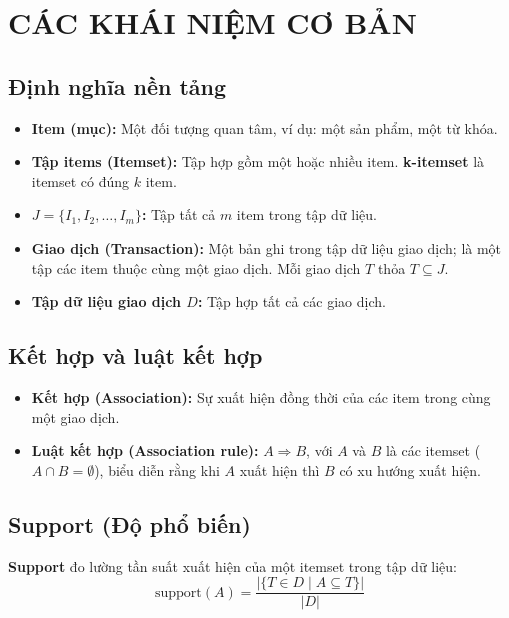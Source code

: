 \documentclass[10pt]{article}
\begin{document}
\section{CÁC KHÁI NIỆM CƠ BẢN}

\subsection{Định nghĩa nền tảng}

\begin{itemize}
    \item \textbf{Item (mục):} Một đối tượng quan tâm, ví dụ: một sản phẩm, một từ khóa.
    \item \textbf{Tập items (Itemset):} Tập hợp gồm một hoặc nhiều item. \textbf{k-itemset} là itemset có đúng $k$ item.
    \item \textbf{$J = \{I_1, I_2, \ldots, I_m\}$:} Tập tất cả $m$ item trong tập dữ liệu.
    \item \textbf{Giao dịch (Transaction):} Một bản ghi trong tập dữ liệu giao dịch; là một tập các item thuộc cùng một giao dịch. Mỗi giao dịch $T$ thỏa $T \subseteq J$.
    \item \textbf{Tập dữ liệu giao dịch $D$:} Tập hợp tất cả các giao dịch.
\end{itemize}

\subsection{Kết hợp và luật kết hợp}

\begin{itemize}
    \item \textbf{Kết hợp (Association):} Sự xuất hiện đồng thời của các item trong cùng một giao dịch.
    \item \textbf{Luật kết hợp (Association rule):} $A \Rightarrow B$, với $A$ và $B$ là các itemset ($A \cap B = \emptyset$), biểu diễn rằng khi $A$ xuất hiện thì $B$ có xu hướng xuất hiện.
\end{itemize}

\subsection{Support (Độ phổ biến)}

\textbf{Support} đo lường tần suất xuất hiện của một itemset trong tập dữ liệu:
\[
\text{support}(A) = \frac{|\{T \in D \mid A \subseteq T\}|}{|D|}
\]
\end{document}
